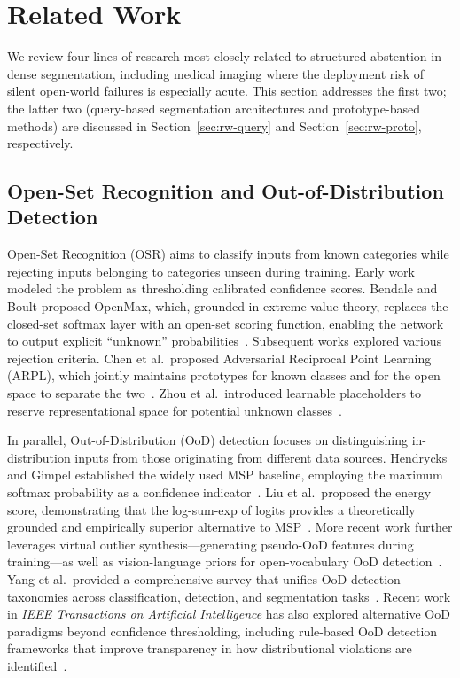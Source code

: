 \documentclass[journal]{IEEEtai}
\begin{document}
\section{Related Work}
\label{sec:related}

We review four lines of research most closely related to structured abstention
in dense segmentation, including medical imaging where the deployment risk of
silent open-world failures is especially acute.
This section addresses the first two;
the latter two (query-based segmentation architectures and prototype-based methods)
are discussed in Section~\ref{sec:rw-query} and Section~\ref{sec:rw-proto},
respectively.

\subsection{Open-Set Recognition and Out-of-Distribution Detection}
\label{sec:rw-osr}

Open-Set Recognition (OSR) aims to classify inputs from known categories while
rejecting inputs belonging to categories unseen during training.
Early work modeled the problem as thresholding calibrated confidence scores.
Bendale and Boult proposed OpenMax, which, grounded in extreme value theory,
replaces the closed-set softmax layer with an open-set scoring function, enabling
the network to output explicit ``unknown'' probabilities~\cite{bendale2016towardsopen}.
Subsequent works explored various rejection criteria.
Chen et al.\ proposed Adversarial Reciprocal Point Learning (ARPL), which jointly
maintains prototypes for known classes and for the open space to separate the
two~\cite{chen2022adversarialreciprocal}.
Zhou et al.\ introduced learnable placeholders to reserve representational space for
potential unknown classes~\cite{zhou2021learningplaceholders}.

In parallel, Out-of-Distribution (OoD) detection focuses on distinguishing in-distribution
inputs from those originating from different data sources.
Hendrycks and Gimpel established the widely used MSP baseline, employing the maximum
softmax probability as a confidence indicator~\cite{hendrycks2017baselinedetecting}.
Liu et al.\ proposed the energy score, demonstrating that the log-sum-exp of logits
provides a theoretically grounded and empirically superior alternative to
MSP~\cite{liu2020energyout}.
More recent work further leverages virtual outlier synthesis---generating pseudo-OoD
features during training---as well as vision-language priors for open-vocabulary OoD
detection~\cite{he2022ronfreliable,ming2022delvingout}.
Yang et al.\ provided a comprehensive survey that unifies OoD detection taxonomies
across classification, detection, and segmentation tasks~\cite{yang2024generalizedout}.
Recent work in \emph{IEEE Transactions on Artificial Intelligence} has also explored
alternative OoD paradigms beyond confidence thresholding, including rule-based OoD
detection frameworks that improve transparency in how distributional violations are
identified~\cite{debernardi2024rulebasedood}.
\end{document}

